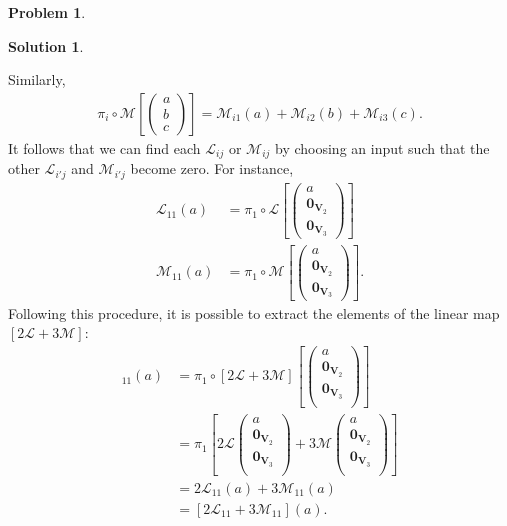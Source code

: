\documentclass{article}
\theoremstyle{definition}
\newtheorem*{prob*}{Problem}
\newtheorem*{sln*}{Solution}
\newcommand{\V}{\mathbf{V}}
\newcommand{\lag}{\mathcal{L}}
\newcommand{\M}{\mathcal{M}}
\begin{document}
\begin{prob*}
\begin{sln*}
\begin{enumerate}
\begin{enumerate}
			Similarly,
			\begin{align*}
			\pi_i \circ \M\left[ \begin{pmatrix}
			a\\b\\c
			\end{pmatrix} \right]
			=
			\M_{i1}(a) + \M_{i2}(b) + \M_{i3}(c).
			\end{align*}
			It follows that we can find each $\lag_{ij}$ or $\M_{ij}$ by choosing an input such that the other $\lag_{i'j}$ and $\M_{i'j}$ become zero. For instance, 
			\begin{align*}
			\lag_{11}(a) &= \pi_1 \circ \lag\left[\begin{pmatrix}
			a \\ \mathbf{0}_{\V_2} \\ \mathbf{0}_{\V_3} 
			\end{pmatrix} \right]\\
			\M_{11}(a) &= \pi_1 \circ \M\left[\begin{pmatrix}
			a \\ \mathbf{0}_{\V_2} \\ \mathbf{0}_{\V_3} 
			\end{pmatrix} \right].
			\end{align*}
			Following this procedure, it is possible to extract the elements of the linear map $[2\lag + 3\M]$:
			\begin{align*}
			[2\lag + 3\M]_{11}(a) &= \pi_1 \circ [2\lag + 3\M]\left[\begin{pmatrix}
			a\\ \mathbf{0}_{\V_2} \\ \mathbf{0}_{\V_3}\\
			\end{pmatrix}\right]\\
			&= \pi_1 \left[2\lag\begin{pmatrix}
			a\\ \mathbf{0}_{\V_2} \\ \mathbf{0}_{\V_3}\\
			\end{pmatrix} + 3\M \begin{pmatrix}
			a\\ \mathbf{0}_{\V_2} \\ \mathbf{0}_{\V_3}\\
			\end{pmatrix} \right]\\
			&= 2\lag_{11}(a) + 3\M_{11}(a)\\
			&= [2\lag_{11} + 3\M_{11}](a).

\end{align*}
\end{enumerate}
\end{enumerate}
\end{sln*}
\end{prob*}
\end{document}
